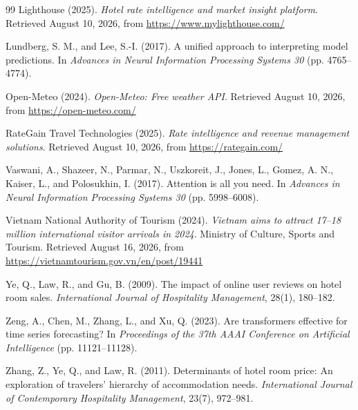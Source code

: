 \begin{singlespace}
\begin{thebibliography}{99}
Lighthouse (2025). \textit{Hotel rate intelligence and market insight platform}. Retrieved August 10, 2026, from \url{https://www.mylighthouse.com/}

Lundberg, S. M., and Lee, S.-I. (2017). A unified approach to interpreting model predictions. In \textit{Advances in Neural Information Processing Systems 30} (pp. 4765--4774).

Open-Meteo (2024). \textit{Open-Meteo: Free weather API}. Retrieved August 10, 2026, from \url{https://open-meteo.com/}

RateGain Travel Technologies (2025). \textit{Rate intelligence and revenue management solutions}. Retrieved August 10, 2026, from \url{https://rategain.com/}

Vaswani, A., Shazeer, N., Parmar, N., Uszkoreit, J., Jones, L., Gomez, A. N., Kaiser, L., and Polosukhin, I. (2017). Attention is all you need. In \textit{Advances in Neural Information Processing Systems 30} (pp. 5998--6008).

Vietnam National Authority of Tourism (2024). \textit{Vietnam aims to attract 17--18 million international visitor arrivals in 2024}. Ministry of Culture, Sports and Tourism. Retrieved August 16, 2026, from \url{https://vietnamtourism.gov.vn/en/post/19441}

Ye, Q., Law, R., and Gu, B. (2009). The impact of online user reviews on hotel room sales. \textit{International Journal of Hospitality Management}, 28(1), 180--182.

Zeng, A., Chen, M., Zhang, L., and Xu, Q. (2023). Are transformers effective for time series forecasting? In \textit{Proceedings of the 37th AAAI Conference on Artificial Intelligence} (pp. 11121--11128).

Zhang, Z., Ye, Q., and Law, R. (2011). Determinants of hotel room price: An exploration of travelers' hierarchy of accommodation needs. \textit{International Journal of Contemporary Hospitality Management}, 23(7), 972--981.

\end{thebibliography}
\end{singlespace}

